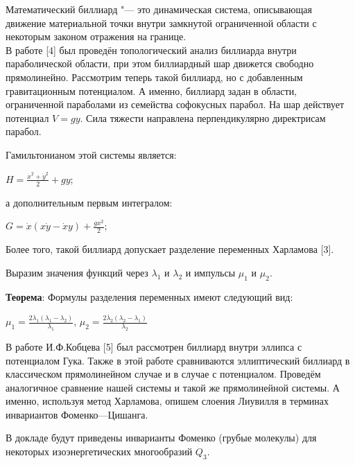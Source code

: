 
\vzmscaption

Математический биллиард "--- это динамическая система, описывающая движение материальной точки внутри замкнутой ограниченной области с некоторым законом отражения на границе.
\\ В работе [4] был проведён топологический анализ биллиарда внутри параболической области, при этом биллиардный шар движется свободно прямолинейно. Рассмотрим теперь такой биллиард, но с добавленным гравитационным потенциалом.
А именно, биллиард задан в области, ограниченной параболами из семейства софокусных парабол. На шар действует потенциал $V = gy$.
Сила тяжести направлена перпендикулярно директрисам парабол.
\par Гамильтонианом этой системы является:
\begin{center}
$H = \frac{\dot{x}^2 + \dot{y}^2}{2} + gy$;
\end{center}
а дополнительным первым интегралом:
\begin{center}
$G = \dot{x}(x \dot{y} - \dot{x}y) + \frac{gx^2}{2}$;
\end{center}

Более того, такой биллиард допускает разделение переменных Харламова [3].

\par Выразим значения функций через $\lambda_1$ и $\lambda_2$ и импульсы $\mu_1$ и $\mu_2$.

\textbf{Теорема}: Формулы разделения переменных имеют следующий вид:
\begin{center}
$\mu_1 =\frac{ 2 \dot{\lambda_1}(\lambda_1 - \lambda_2)}{\lambda_1}$, $\mu_2 =\frac{ 2 \dot{\lambda_2}(\lambda_2 - \lambda_1)}{\lambda_2}$
\end{center}

\par В работе И.Ф.Кобцева [5] был рассмотрен биллиард внутри эллипса с потенциалом Гука.
Также в этой работе сравниваются эллиптический биллиард в классическом прямолинейном случае и в случае с потенциалом.
Проведём аналогичное сравнение нашей системы и такой же прямолинейной системы.
А именно, используя метод Харламова, опишем слоения Лиувилля в терминах инвариантов Фоменко---Цишанга.

В докладе будут приведены инварианты Фоменко (грубые молекулы) для некоторых изоэнергетических многообразий $Q_3$.


